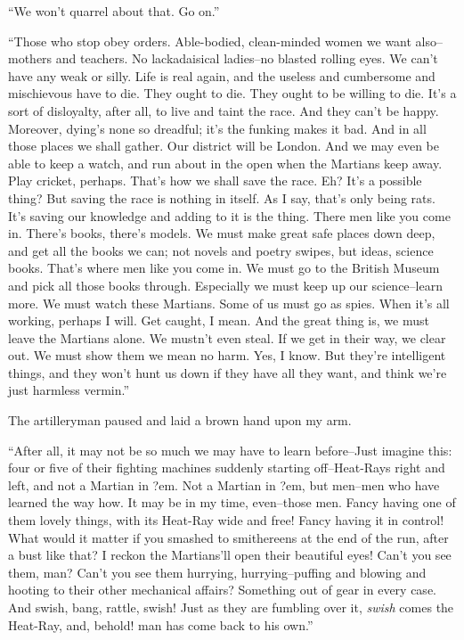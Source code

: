 ``We won't quarrel about that. Go on.''

``Those who stop obey orders. Able-bodied, clean-minded women we
want also--mothers and teachers. No lackadaisical ladies--no
blasted rolling eyes. We can't have any weak or silly. Life is real
again, and the useless and cumbersome and mischievous have to die.
They ought to die. They ought to be willing to die. It's a sort of
disloyalty, after all, to live and taint the race. And they can't
be happy. Moreover, dying's none so dreadful; it's the funking
makes it bad. And in all those places we shall gather. Our district
will be London. And we may even be able to keep a watch, and run
about in the open when the Martians keep away. Play cricket,
perhaps. That's how we shall save the race. Eh? It's a possible
thing? But saving the race is nothing in itself. As I say, that's
only being rats. It's saving our knowledge and adding to it is the
thing. There men like you come in. There's books, there's models.
We must make great safe places down deep, and get all the books we
can; not novels and poetry swipes, but ideas, science books. That's
where men like you come in. We must go to the British Museum and
pick all those books through. Especially we must keep up our
science--learn more. We must watch these Martians. Some of us must
go as spies. When it's all working, perhaps I will. Get caught, I
mean. And the great thing is, we must leave the Martians alone. We
mustn't even steal. If we get in their way, we clear out. We must
show them we mean no harm. Yes, I know. But they're intelligent
things, and they won't hunt us down if they have all they want, and
think we're just harmless vermin.''

The artilleryman paused and laid a brown hand upon my arm.

``After all, it may not be so much we may have to learn before--Just
imagine this: four or five of their fighting machines suddenly
starting off--Heat-Rays right and left, and not a Martian in ?em.
Not a Martian in ?em, but men--men who have learned the way how. It
may be in my time, even--those men. Fancy having one of them lovely
things, with its Heat-Ray wide and free! Fancy having it in
control! What would it matter if you smashed to smithereens at the
end of the run, after a bust like that? I reckon the Martians'll
open their beautiful eyes! Can't you see them, man? Can't you see
them hurrying, hurrying--puffing and blowing and hooting to their
other mechanical affairs? Something out of gear in every case. And
swish, bang, rattle, swish! Just as they are fumbling over it,
\emph{swish} comes the Heat-Ray, and, behold! man has come back to
his own.''

